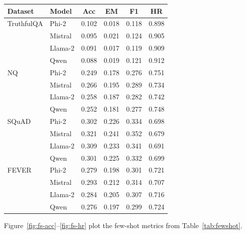 \documentclass[sigconf,nonacm]{acmart}
\begin{document}
\vspace{0.5\baselineskip}
\begingroup
\centering
\captionsetup{skip=4pt}
\label{tab:fewshot}
\small
\setlength{\tabcolsep}{3.5pt}
\begin{tabular}{l lcccc}
\hline
Dataset & Model & Acc & EM & F1 & HR \\
\hline
TruthfulQA & Phi-2      & 0.102 & 0.018 & 0.118 & 0.898 \\
           & Mistral    & 0.095 & 0.021 & 0.124 & 0.905 \\
           & Llama-2    & 0.091 & 0.017 & 0.119 & 0.909 \\
           & Qwen       & 0.088 & 0.019 & 0.121 & 0.912 \\

NQ         & Phi-2      & 0.249 & 0.178 & 0.276 & 0.751 \\
           & Mistral    & 0.266 & 0.195 & 0.289 & 0.734 \\
           & Llama-2    & 0.258 & 0.187 & 0.282 & 0.742 \\
           & Qwen       & 0.252 & 0.181 & 0.277 & 0.748 \\

SQuAD      & Phi-2      & 0.302 & 0.226 & 0.334 & 0.698 \\
           & Mistral    & 0.321 & 0.241 & 0.352 & 0.679 \\
           & Llama-2    & 0.309 & 0.233 & 0.341 & 0.691 \\
           & Qwen       & 0.301 & 0.225 & 0.332 & 0.699 \\

FEVER      & Phi-2      & 0.279 & 0.198 & 0.301 & 0.721 \\
           & Mistral    & 0.293 & 0.212 & 0.314 & 0.707 \\
           & Llama-2    & 0.284 & 0.205 & 0.307 & 0.716 \\
           & Qwen       & 0.276 & 0.197 & 0.299 & 0.724 \\
\hline
\end{tabular}
\par
\endgroup

\noindent Figure~\ref{fig:fs-acc}--\ref{fig:fs-hr} plot the few-shot metrics from Table~\ref{tab:fewshot}.
\end{document}
